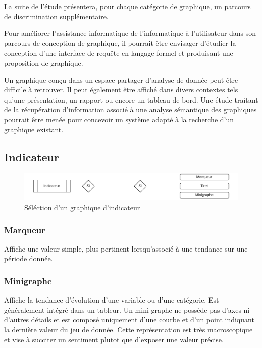 \documentclass[a4paper,12pt]{article}
\begin{document}
\begin{multicols}{2}
La suite de l'étude présentera, pour chaque catégorie de graphique, un parcours de discrimination supplémentaire.

Pour améliorer l'assistance informatique de l'informatique  à l'utilisateur dans son parcours de conception de graphique, il pourrait être envisager d'étudier la conception d'une interface de requête en langage formel et produisant une proposition de graphique.

Un graphique conçu dans un espace partager d'analyse de donnée peut être difficile à retrouver. Il peut également être affiché dans divers contextes tels qu'une présentation, un rapport ou encore un tableau de bord. Une étude traitant de la récupération d'information associé à une analyse sémantique des graphiques pourrait être menée pour concevoir un système adapté à la recherche d'un graphique existant.
\subsection*{Indicateur}
\label{sec:org0cf0e5b}

\begin{figure}
\centering
\includegraphics[width=.9\linewidth]{./img/select-indicateur.pdf}
\caption{\label{fig:select-indicateur}Séléction d'un graphique d'indicateur}
\end{figure}
\subsubsection*{Marqueur}
\label{sec:org3631846}
Affiche une valeur simple, plus pertinent lorsqu'associé à une tendance sur une période donnée. \autocite{mikeyiHowChooseRight2020}
\subsubsection*{Minigraphe}
\label{sec:orgcd20cd7}
Affiche la tendance d'évolution d'une variable ou d'une catégorie. Est généralement intégré dans un tableur. Un mini-graphe ne possède pas d'axes ni d'autres détails et est composé uniquement d'une courbe et d'un point indiquant la dernière valeur du jeu de donnée. \autocite{sosulskiGraphics2019} Cette représentation est très macroscopique et vise à succiter un sentiment plutot que d'exposer une valeur précise. \autocite{jonathanschwabishDistribution2021}


\end{multicols}
\end{document}
